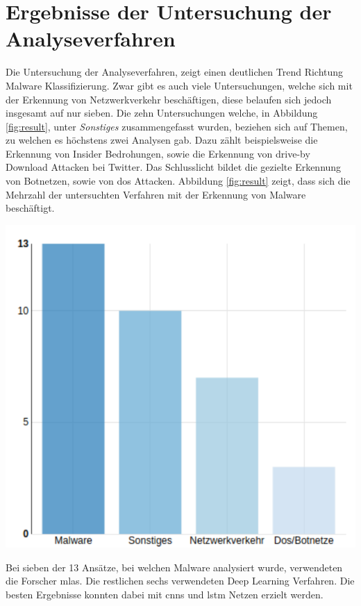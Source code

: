 \documentclass[
    12pt, %
    DIV10,
    ngerman, %
    a4paper, %
    oneside, %
    titlepage, %
    parskip=half, %
    headings=normal, %
    listof=totoc, %
    bibliography=totoc, %
    index=totoc, %
    captions=tableheading, %
    final %
]{scrreprt}
\begin{document}
\section{Ergebnisse der Untersuchung der Analyseverfahren}\label{sec:ergebnis}
Die Untersuchung der Analyseverfahren, zeigt einen deutlichen Trend Richtung Malware Klassifizierung. Zwar gibt es auch viele Untersuchungen, welche sich mit der Erkennung von Netzwerkverkehr beschäftigen, diese belaufen sich jedoch insgesamt auf nur sieben. Die zehn Untersuchungen welche, in Abbildung \ref{fig:result}, unter \emph{Sonstiges} zusammengefasst wurden, beziehen sich auf Themen, zu welchen es höchstens zwei Analysen gab. Dazu zählt beispielsweise die Erkennung von Insider Bedrohungen, sowie die Erkennung von drive-by Download Attacken bei Twitter. Das Schlusslicht bildet die gezielte Erkennung von Botnetzen, sowie von \ac{dos} Attacken. Abbildung \ref{fig:result} zeigt, dass sich die Mehrzahl der untersuchten Verfahren mit der Erkennung von Malware beschäftigt.
\begin{center}
\includegraphics[scale=0.7]{img/res.pdf}
\label{fig:result}
\end{center}
Bei sieben der 13 Ansätze, bei welchen Malware analysiert wurde, verwendeten die Forscher \ac{mlas}. Die restlichen sechs verwendeten Deep Learning Verfahren. Die besten Ergebnisse konnten dabei mit \ac{cnns} und \ac{lstm} Netzen erzielt werden.\\
\end{document}
